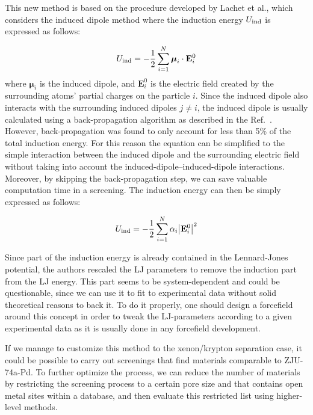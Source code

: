 \documentclass[main]{subfiles}
\begin{document}
This new method is based on the procedure developed by Lachet et al.\autocite{Lachet_1998}, which considers the induced dipole method where the induction energy $U_{\text{ind}}$ is expressed as follows:

\begin{equation}
  U_{\text{ind}} = -\frac{1}{2} \sum_{i=1}^{N} \boldsymbol{\mu}_i \cdot \mathbf{E}_i^0
\end{equation}
where $\boldsymbol{\mu}_i$ is the induced dipole, and $\mathbf{E}_i^0$ is the electric field created by the surrounding atoms' partial charges on the particle $i$. Since the induced dipole also interacts with the surrounding induced dipoles $j$$\neq$$i$, the induced dipole is usually calculated using a back-propagation algorithm as described in the Ref.~\cite{Lachet_1998}. However, back-propagation was found to only account for less than {5\%} of the total induction energy. For this reason the equation can be simplified to the simple interaction between the induced dipole and the surrounding electric field without taking into account the induced-dipole--induced-dipole interactions. Moreover, by skipping the back-propagation step, we can save valuable computation time in a screening. The induction energy can then be simply expressed as follows:

\begin{equation}
  U_{\text{ind}} = -\frac{1}{2} \sum_{i=1}^{N} \alpha_i {\left\lvert\mathbf{E}_i^0\right\rvert}^2
\end{equation}

Since part of the induction energy is already contained in the Lennard-Jones potential, the authors rescaled the LJ parameters to remove the induction part from the LJ energy. This part seems to be system-dependent and could be questionable, since we can use it to fit to experimental data without solid theoretical reasons to back it. To do it properly, one should design a forcefield around this concept in order to tweak the LJ-parameters according to a given experimental data as it is usually done in any forcefield development. 

If we manage to customize this method to the xenon/krypton separation case, it could be possible to carry out screenings that find materials comparable to ZJU-74a-Pd. To further optimize the process, we can reduce the number of materials by restricting the screening process to a certain pore size and that contains open metal sites within a database, and then evaluate this restricted list using higher-level methods. 


\OnlyInSubfile{\printglobalbibliography}
\end{document}
